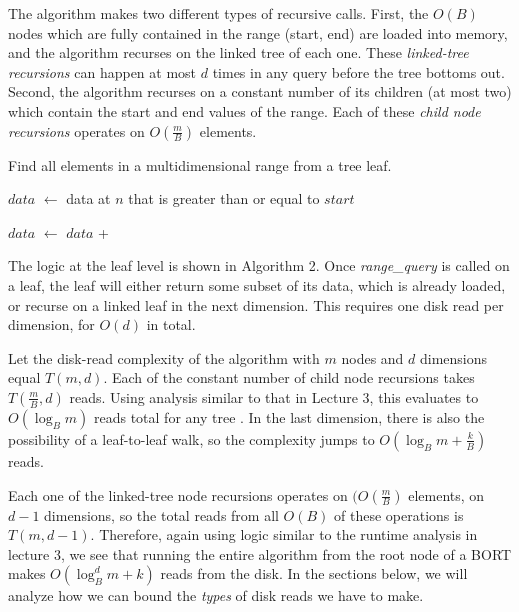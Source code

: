 \documentclass[11pt, oneside]{article}
\newcommand*\Let[2]{\State #1 $\gets$ #2}
\newcommand{\ms}{\textit}
\begin{document}
The algorithm makes two different types of recursive calls. First, the
$O(B)$ nodes which are fully contained in the range (start, end) are loaded into
memory, and the algorithm recurses on the linked tree of each one. These
\textit{linked-tree recursions} can happen at most $d$ times in any query before the
tree bottoms out. Second, the algorithm recurses on a constant number of its
children (at most two) which contain the start and end values of the range.
Each of these \textit{child node recursions} operates on $O(\frac{m}{B})$ elements.

\begin{algorithm}[H]
    \caption{Find all elements in a multidimensional range from a tree leaf.}
    \begin{algorithmic}[1]
            \Let{$data$}{data at $n$ that is greater than or equal to $start$}

            \Let{$data$}{$data$ + } 
            \EndIf

            \State {}
        \EndFunction
    \end{algorithmic}
\end{algorithm}

The logic at the leaf level is shown in Algorithm 2. Once \ms{range\_query} is
called on a leaf, the leaf will either return some subset of its data, which is
already loaded, or recurse on a linked leaf in the next dimension. This requires
one disk read per dimension, for $O(d)$ in total. 

Let the disk-read complexity of the algorithm with $m$ nodes and $d$ dimensions
equal $T(m, d)$. Each of the constant number of child node recursions takes
$T(\frac{m}{B}, d)$ reads. Using analysis similar to that in Lecture 3, this
evaluates to $O(\log_B m)$ reads total for any tree \cite{lecture}. In the last
dimension, there is also the possibility of a leaf-to-leaf walk, so the
complexity jumps to $O(\log_B m + \frac{k}{B})$ reads. 

Each one of the linked-tree node recursions operates on $(O(\frac{m}{B})$
elements, on $d-1$ dimensions, so the total reads from all $O(B)$ of these
operations is $T(m, d-1)$. Therefore, again using logic similar to the runtime
analysis in lecture 3, we see that running the entire algorithm from the root
node of a BORT makes $O(\log_B^d m + k)$ reads from the disk. In the sections
below, we will analyze how we can bound the \textit{types} of disk reads we have
to make.
\end{document}
